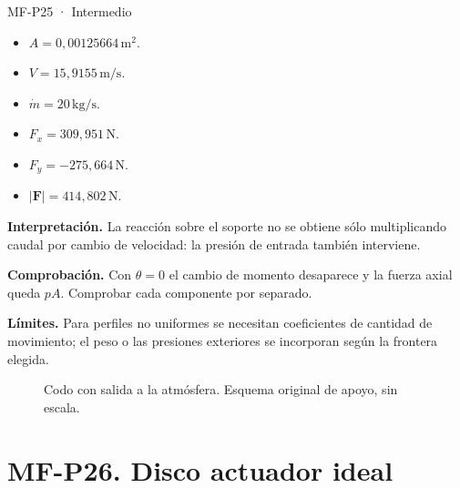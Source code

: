 \begin{studiumworked}{MF-P25 · Intermedio}
\begin{itemize}
\item $A=0{,}00125664\,\mathrm{m^2}$.

\item $V=15{,}9155\,\mathrm{m/s}$.

\item $\dot m=20\,\mathrm{kg/s}$.

\item $F_x=309{,}951\,\mathrm{N}$.

\item $F_y=-275{,}664\,\mathrm{N}$.

\item $|\boldsymbol F|=414{,}802\,\mathrm{N}$.

\end{itemize}

\textbf{Interpretación.} La reacción sobre el soporte no se obtiene sólo multiplicando caudal por cambio de velocidad: la presión de entrada también interviene.

\textbf{Comprobación.} Con $\theta=0$ el cambio de momento desaparece y la fuerza axial queda $pA$. Comprobar cada componente por separado.

\textbf{Límites.} Para perfiles no uniformes se necesitan coeficientes de cantidad de movimiento; el peso o las presiones exteriores se incorporan según la frontera elegida.

\end{studiumworked}


\begin{figure}[htbp]\centering{}\caption{Codo con salida a la atmósfera. Esquema original de apoyo, sin escala.}\label{fig:mf-p25}\end{figure}


\Needspace{.30\textheight}\section{MF-P26. Disco actuador ideal}

